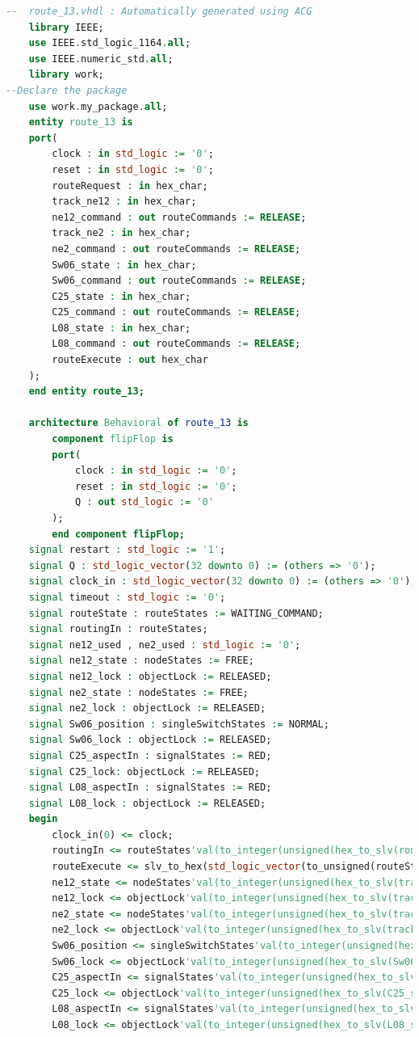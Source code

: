 	\begin{lstlisting}[language = {vhdl}, caption = route\_13.vdhl, label = {lst:EJ1_vhdl}, tabsize=2, basicstyle=\footnotesize\ttfamily]
--  route_13.vhdl : Automatically generated using ACG
	library IEEE;
	use IEEE.std_logic_1164.all;
	use IEEE.numeric_std.all;
	library work;
--Declare the package
	use work.my_package.all;
	entity route_13 is
	port(
		clock : in std_logic := '0';
		reset : in std_logic := '0';
		routeRequest : in hex_char;
		track_ne12 : in hex_char;
		ne12_command : out routeCommands := RELEASE;
		track_ne2 : in hex_char;
		ne2_command : out routeCommands := RELEASE;
		Sw06_state : in hex_char;
		Sw06_command : out routeCommands := RELEASE;
		C25_state : in hex_char;
		C25_command : out routeCommands := RELEASE;
		L08_state : in hex_char;
		L08_command : out routeCommands := RELEASE;
		routeExecute : out hex_char
	);
	end entity route_13;
	
	architecture Behavioral of route_13 is
		component flipFlop is
		port(
			clock : in std_logic := '0';
			reset : in std_logic := '0';
			Q : out std_logic := '0'
		);
		end component flipFlop;
	signal restart : std_logic := '1';
	signal Q : std_logic_vector(32 downto 0) := (others => '0');
	signal clock_in : std_logic_vector(32 downto 0) := (others => '0');
	signal timeout : std_logic := '0';
	signal routeState : routeStates := WAITING_COMMAND;
	signal routingIn : routeStates;
	signal ne12_used , ne2_used : std_logic := '0';
	signal ne12_state : nodeStates := FREE;
	signal ne12_lock : objectLock := RELEASED;
	signal ne2_state : nodeStates := FREE;
	signal ne2_lock : objectLock := RELEASED;
	signal Sw06_position : singleSwitchStates := NORMAL;
	signal Sw06_lock : objectLock := RELEASED;
	signal C25_aspectIn : signalStates := RED;
	signal C25_lock: objectLock := RELEASED;
	signal L08_aspectIn : signalStates := RED;
	signal L08_lock : objectLock := RELEASED;
	begin
		clock_in(0) <= clock;
		routingIn <= routeStates'val(to_integer(unsigned(hex_to_slv(routeRequest))));
		routeExecute <= slv_to_hex(std_logic_vector(to_unsigned(routeStates'pos(routeState),4)));
		ne12_state <= nodeStates'val(to_integer(unsigned(hex_to_slv(track_ne12)(2 to 3))));
		ne12_lock <= objectLock'val(to_integer(unsigned(hex_to_slv(track_ne12)(0 to 1))));
		ne2_state <= nodeStates'val(to_integer(unsigned(hex_to_slv(track_ne2)(2 to 3))));
		ne2_lock <= objectLock'val(to_integer(unsigned(hex_to_slv(track_ne2)(0 to 1))));
		Sw06_position <= singleSwitchStates'val(to_integer(unsigned(hex_to_slv(Sw06_state)(2 to 3))));
		Sw06_lock <= objectLock'val(to_integer(unsigned(hex_to_slv(Sw06_state)(0 to 1))));
		C25_aspectIn <= signalStates'val(to_integer(unsigned(hex_to_slv(C25_state)(2 to 3))));
		C25_lock <= objectLock'val(to_integer(unsigned(hex_to_slv(C25_state)(0 to 1))));
		L08_aspectIn <= signalStates'val(to_integer(unsigned(hex_to_slv(L08_state)(2 to 3))));
		L08_lock <= objectLock'val(to_integer(unsigned(hex_to_slv(L08_state)(0 to 1))));
	

\end{lstlisting}
